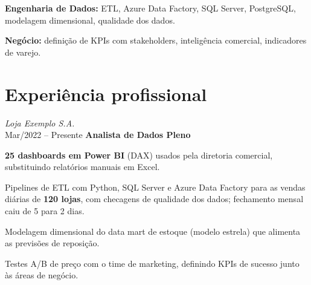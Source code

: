         \vspace{0.12 cm}

        \begin{onecolentry}
            \textbf{Engenharia de Dados:} ETL, Azure Data Factory, SQL Server, PostgreSQL, modelagem dimensional, qualidade dos dados.
        \end{onecolentry}

        \vspace{0.12 cm}

        \begin{onecolentry}
            \textbf{Negócio:} definição de KPIs com stakeholders, inteligência comercial, indicadores de varejo.
        \end{onecolentry}

    \section{Experiência profissional}
        \begin{twocolentry}{
            \textit{Loja Exemplo S.A.} \\
            Mar/2022 -- Presente
        }
            \textbf{Analista de Dados Pleno}
        \end{twocolentry}
        \vspace{0.10cm}
        \begin{onecolentry}
            \begin{highlights}
                \item \textbf{25 dashboards em Power BI} (DAX) usados pela diretoria comercial, substituindo relatórios manuais em Excel.
                \item Pipelines de ETL com Python, SQL Server e Azure Data Factory para as vendas diárias de \textbf{120 lojas}, com checagens de qualidade dos dados; fechamento mensal caiu de 5 para 2 dias.
                \item Modelagem dimensional do data mart de estoque (modelo estrela) que alimenta as previsões de reposição.
                \item Testes A/B de preço com o time de marketing, definindo KPIs de sucesso junto às áreas de negócio.
            \end{highlights}
        \end{onecolentry}
        \vspace{0.2cm}

